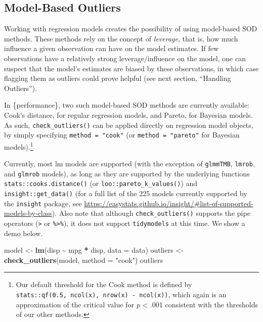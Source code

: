 \documentclass[sn-basic, lineno,pdflatex]{sn-jnl}
\newenvironment{Shaded}{\begin{snugshade}}{\end{snugshade}}
\newcommand{\AttributeTok}[1]{\textcolor[rgb]{0.13,0.29,0.53}{#1}}
\newcommand{\FunctionTok}[1]{\textcolor[rgb]{0.13,0.29,0.53}{\textbf{#1}}}
\newcommand{\NormalTok}[1]{#1}
\newcommand{\OtherTok}[1]{\textcolor[rgb]{0.56,0.35,0.01}{#1}}
\newcommand{\SpecialCharTok}[1]{\textcolor[rgb]{0.81,0.36,0.00}{\textbf{#1}}}
\newcommand{\StringTok}[1]{\textcolor[rgb]{0.31,0.60,0.02}{#1}}
\begin{document}
\subsection{Model-Based Outliers}\label{model-based-outliers}

Working with regression models creates the possibility of using
model-based SOD methods. These methods rely on the concept of
\emph{leverage}, that is, how much influence a given observation can
have on the model estimates. If few observations have a relatively
strong leverage/influence on the model, one can suspect that the model's
estimates are biased by these observations, in which case flagging them
as outliers could prove helpful (see next section, ``Handling
Outliers'').

In \{performance\}, two such model-based SOD methods are currently
available: Cook's distance, for regular regression models, and Pareto,
for Bayesian models. As such, \texttt{check\_outliers()} can be applied
directly on regression model objects, by simply specifying
\texttt{method\ =\ "cook"} (or \texttt{method\ =\ "pareto"} for Bayesian
models).\footnote{Our default threshold for the Cook method is defined
  by \texttt{stats::qf(0.5,\ ncol(x),\ nrow(x)\ -\ ncol(x))}, which
  again is an approximation of the critical value for \emph{p}
  \textless{} .001 consistent with the thresholds of our other methods.}

Currently, most lm models are supported (with the exception of
\texttt{glmmTMB}, \texttt{lmrob}, and \texttt{glmrob} models), as long
as they are supported by the underlying functions
\texttt{stats::cooks.distance()} (or \texttt{loo::pareto\_k\_values()})
and \texttt{insight::get\_data()} (for a full list of the 225 models
currently supported by the \texttt{insight} package, see
\url{https://easystats.github.io/insight/\#list-of-supported-models-by-class}).
Also note that although \texttt{check\_outliers()} supports the pipe
operators (\texttt{\textbar{}\textgreater{}} or
\texttt{\%\textgreater{}\%}), it does not support \texttt{tidymodels} at
this time. We show a demo below.

\begin{Shaded}
\begin{Highlighting}[]
\NormalTok{model }\OtherTok{\textless{}{-}} \FunctionTok{lm}\NormalTok{(disp }\SpecialCharTok{\textasciitilde{}}\NormalTok{ mpg }\SpecialCharTok{*}\NormalTok{ disp, }\AttributeTok{data =}\NormalTok{ data)}
\NormalTok{outliers }\OtherTok{\textless{}{-}} \FunctionTok{check\_outliers}\NormalTok{(model, }\AttributeTok{method =} \StringTok{"cook"}\NormalTok{)}
\NormalTok{outliers}
\end{Highlighting}
\end{Shaded}
\end{document}
